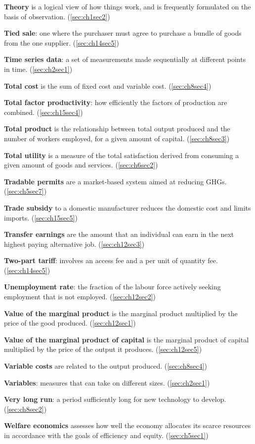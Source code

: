 \textbf{Theory} is a logical view of how things work, and is frequently formulated on the basis of observation. (\ref{sec:ch1sec2})

\textbf{Tied sale}: one where the purchaser must agree to purchase a bundle of goods from the one supplier. (\ref{sec:ch14sec5})

\textbf{Time series data}: a set of measurements made sequentially at different points in time. (\ref{sec:ch2sec1})

\textbf{Total cost} is the sum of fixed cost and variable cost. (\ref{sec:ch8sec4})

\textbf{Total factor productivity}: how efficiently the factors of production are combined. (\ref{sec:ch15sec4})

\textbf{Total product} is the relationship between total output produced and the number of workers employed, for a given amount of capital. (\ref{sec:ch8sec3})

\textbf{Total utility} is a measure of the total satisfaction derived from consuming a given amount of goods and services. (\ref{sec:ch6sec2})

\textbf{Tradable permits} are a market-based system aimed at reducing GHGs. (\ref{sec:ch5sec7})

\textbf{Trade subsidy} to a domestic manufacturer reduces the domestic cost and limits imports. (\ref{sec:ch15sec5})

\textbf{Transfer earnings} are the amount that an individual can earn in the next highest paying alternative job. (\ref{sec:ch12sec3})

\textbf{Two-part tariff}: involves an access fee and a per unit of quantity fee. (\ref{sec:ch14sec5})

\textbf{Unemployment rate}: the fraction of the labour force actively seeking employment that is not employed. (\ref{sec:ch12sec2})

\textbf{Value of the marginal product} is the marginal product multiplied by the price of the good produced. (\ref{sec:ch12sec1})

\textbf{Value of the marginal product of capital} is the marginal product of capital multiplied by the price of the output it produces. (\ref{sec:ch12sec5})

\textbf{Variable costs} are related to the output produced. (\ref{sec:ch8sec4})

\textbf{Variables}: measures that can take on different sizes. (\ref{sec:ch2sec1})

\textbf{Very long run}: a period sufficiently long for new technology to develop. (\ref{sec:ch8sec2})

\textbf{Welfare economics} assesses how well the economy allocates its scarce resources in accordance with the goals of efficiency and equity. (\ref{sec:ch5sec1})